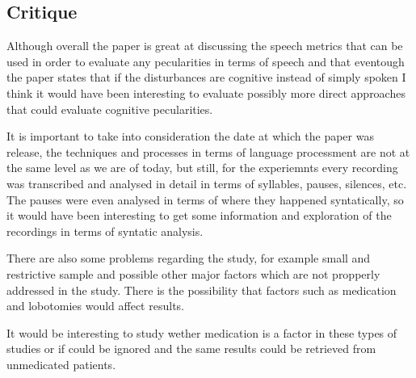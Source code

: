 \documentclass{Paper_Summary}
\begin{document}
\makepapertitle

\breakline

\begin{center}
    \section*{Critique}
\end{center}
    
    Although overall the paper is great at discussing the speech metrics that can be used in order to evaluate any pecularities in terms of speech and that eventough the paper states that if the disturbances are cognitive instead of simply spoken I think it would have been interesting to evaluate possibly more direct approaches that could evaluate cognitive pecularities.

    It is important to take into consideration the date at which the paper was release, the techniques and processes in terms of language processment are not at the same level as we are of today, but still, for the experiemnts every recording was transcribed and analysed in detail in terms of syllables, pauses, silences, etc. The pauses were even analysed in terms of where they happened syntatically, so it would have been interesting to get some information and exploration of the recordings in terms of syntatic analysis.
    
    There are also some problems regarding the study, for example small and restrictive sample and possible other major factors which are not propperly addressed in the study. There is the possibility that factors such as medication and lobotomies would affect results.

    It would be interesting to study wether medication is a factor in these types of studies or if could be ignored and the same results could be retrieved from unmedicated patients.
\end{document}
